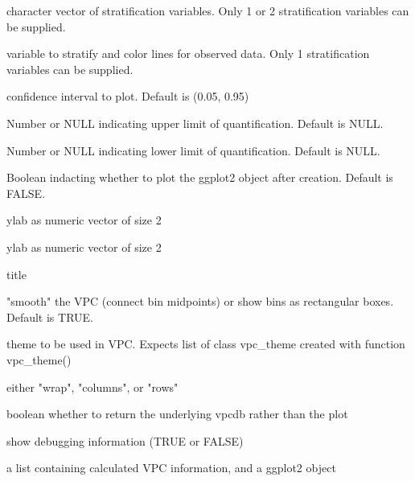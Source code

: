 \documentclass[letterpaper]{book}
\begin{document}
\begin{Arguments}
\begin{ldescription}
\item[\code{stratify}] character vector of stratification variables. Only 1 or 2 stratification variables can be supplied.

\item[\code{stratify\_color}] variable to stratify and color lines for observed data. Only 1 stratification variables can be supplied.

\item[\code{ci}] confidence interval to plot. Default is (0.05, 0.95)

\item[\code{uloq}] Number or NULL indicating upper limit of quantification. Default is NULL.

\item[\code{lloq}] Number or NULL indicating lower limit of quantification. Default is NULL.

\item[\code{plot}] Boolean indacting whether to plot the ggplot2 object after creation. Default is FALSE.

\item[\code{xlab}] ylab as numeric vector of size 2

\item[\code{ylab}] ylab as numeric vector of size 2

\item[\code{title}] title

\item[\code{smooth}] "smooth" the VPC (connect bin midpoints) or show bins as rectangular boxes. Default is TRUE.

\item[\code{vpc\_theme}] theme to be used in VPC. Expects list of class vpc\_theme created with function vpc\_theme()

\item[\code{facet}] either "wrap", "columns", or "rows"

\item[\code{vpcdb}] boolean whether to return the underlying vpcdb rather than the plot

\item[\code{verbose}] show debugging information (TRUE or FALSE)
\end{ldescription}
\end{Arguments}
%
\begin{Value}
a list containing calculated VPC information, and a ggplot2 object
\end{Value}
%
\begin{SeeAlso}\relax
{}
\end{SeeAlso}
\end{document}
